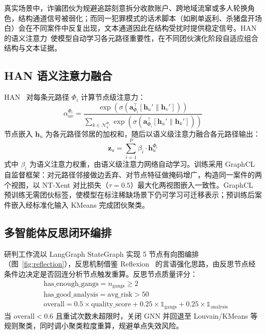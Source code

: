 \documentclass[12pt,a4paper,fontset=windows]{ctexart}
\begin{document}
真实场景中，诈骗团伙为规避追踪刻意拆分收款账户、跨地域流窜或多人轮换角色，结构通道信号被弱化；而同一犯罪模式的话术脚本（如刷单返利、杀猪盘开场白）会在不同案件中反复出现，文本通道因此在结构受扰时提供稳定信号。HAN 的语义注意力~\cite{wang2019han}使模型自动学习各元路径重要性，在不同团伙演化阶段自适应组合结构与文本证据。

\subsection{HAN 语义注意力融合}

HAN~\cite{wang2019han} 对每条元路径 $\Phi_i$ 计算节点级注意力：
\begin{equation}
\alpha_{uv}^{\Phi_i} = \frac{\exp(\sigma(\mathbf{a}_{\Phi_i}^\top [\mathbf{h}_u' \| \mathbf{h}_v']))}
{\sum_{k \in \mathcal{N}_u^{\Phi_i}} \exp(\sigma(\mathbf{a}_{\Phi_i}^\top [\mathbf{h}_u' \| \mathbf{h}_k']))}
\end{equation}
节点嵌入 $\mathbf{h}_u$ 为各元路径邻居的加权和，随后以语义级注意力融合各元路径输出：
\begin{equation}
\mathbf{z}_u = \sum_{i=1}^{P} \beta_i \cdot \mathbf{h}_u^{\Phi_i}
\end{equation}
式中 $\beta_i$ 为语义注意力权重，由语义级注意力网络自动学习。训练采用 GraphCL 自监督框架：对元路径邻接做边丢弃、对节点特征做掩码增广，构造同一案件的两个视图，以 NT-Xent 对比损失（$\tau=0.5$）最大化两视图嵌入一致性。GraphCL 预训练无需团伙标签，使模型在标注稀缺场景下仍可学习可迁移表示；预训练后案件嵌入经标准化输入 KMeans 完成团伙聚类。

\subsection{多智能体反思闭环编排}

研判工作流以 LangGraph StateGraph 实现 5 节点有向图编排（图~\ref{fig:reflection}），反思机制借鉴 Reflexion~\cite{shinn2023reflexion} 的言语强化思路，由反思节点经条件边决定是否回连分析节点触发重算。反思节点质量评分：
\begin{equation}
\begin{aligned}
&\text{has\_enough\_gangs} = n_{\text{gangs}} \ge 2 \\
&\text{has\_good\_analysis} = \text{avg\_risk} > 50 \\
&\text{overall} = 0.5 \times \text{quality\_score} + 0.25 \times \mathbb{1}_{\text{gangs}} + 0.25 \times \mathbb{1}_{\text{analysis}}
\end{aligned}
\end{equation}
当 $\text{overall} < 0.6$ 且重试次数未超限时，关闭 GNN 并回退至 Louvain/KMeans 等规则聚类，同时调小聚类粒度重算，规避单点失效风险。
\end{document}
